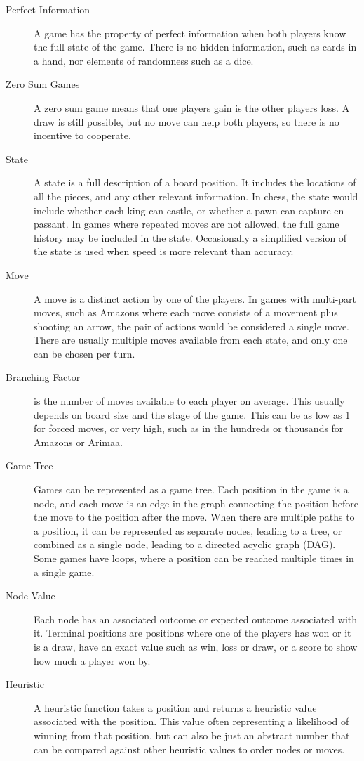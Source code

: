\begin{description}
\item[Perfect Information] A game has the property of perfect information when both players know the full state of the game. There is no hidden information, such as cards in a hand, nor elements of randomness such as a dice.
\item[Zero Sum Games] A zero sum game means that one players gain is the other players loss. A draw is still possible, but no move can help both players, so there is no incentive to cooperate.
\item[State] A state is a full description of a board position. It includes the locations of all the pieces, and any other relevant information. In chess, the state would include whether each king can castle, or whether a pawn can capture en passant. In games where repeated moves are not allowed, the full game history may be included in the state. Occasionally a simplified version of the state is used when speed is more relevant than accuracy.
\item[Move] A move is a distinct action by one of the players. In games with multi-part moves, such as Amazons where each move consists of a movement plus shooting an arrow, the pair of actions would be considered a single move. There are usually multiple moves available from each state, and only one can be chosen per turn.
\item[Branching Factor] is the number of moves available to each player on average. This usually depends on board size and the stage of the game. This can be as low as 1 for forced moves, or very high, such as in the hundreds or thousands for Amazons or Arimaa.
\item[Game Tree] Games can be represented as a game tree. Each position in the game is a node, and each move is an edge in the graph connecting the position before the move to the position after the move. When there are multiple paths to a position, it can be represented as separate nodes, leading to a tree, or combined as a single node, leading to a directed acyclic graph (DAG). Some games have loops, where a position can be reached multiple times in a single game.
\item[Node Value] Each node has an associated outcome or expected outcome associated with it. Terminal positions are positions where one of the players has won or it is a draw, have an exact value such as win, loss or draw, or a score to show how much a player won by.
\item[Heuristic] A heuristic function takes a position and returns a heuristic value associated with the position. This value often representing a likelihood of winning from that position, but can also be just an abstract number that can be compared against other heuristic values to order nodes or moves.

\end{description}
